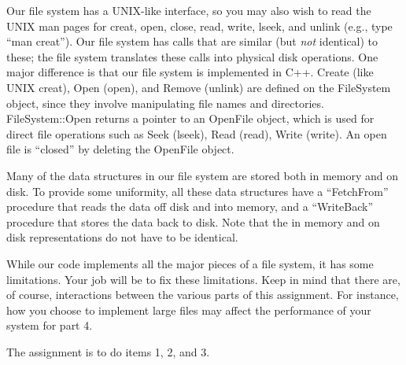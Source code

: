 Our file system has a UNIX-like interface, so you may also wish to read
the UNIX man pages for creat, open, close, read, write, lseek, and unlink
(e.g., type ``man creat'').
Our file system has calls that are similar (but {\em not} identical) to these;
the file system translates these calls
into physical disk operations.  One major difference is that our
file system is implemented in C++.  Create (like UNIX creat),
Open (open), and Remove (unlink) are defined on the FileSystem object,
since they involve manipulating file names and directories.
FileSystem::Open returns a pointer to an OpenFile object,
which is used for direct file operations such as Seek (lseek), Read (read),
Write (write).  An open file is ``closed'' by deleting the OpenFile object.

Many of the data structures in our file system are
stored both in memory and on disk.  To provide some uniformity,
all these data structures
have a ``FetchFrom'' procedure that reads the data off disk and into memory,
and a ``WriteBack'' procedure that stores the data back to disk.
Note that the in memory and on disk representations do not have
to be identical.

While our code implements all the major pieces of a file system, it
has some limitations.  Your job will be to fix these limitations.
Keep in mind that there are, of course, interactions between the
various parts of this assignment.  For instance, how you choose
to implement large files may affect the performance of
your system for part 4.

The assignment is to do items 1, 2, and 3.

